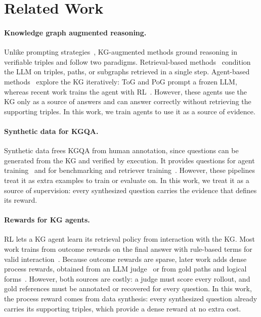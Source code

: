 \section{Related Work}

\paragraph{Knowledge graph augmented reasoning.}
Unlike prompting strategies~\citep{CoT,Self-Consistency,ToT,GoT}, KG-augmented methods ground reasoning in verifiable triples and follow two paradigms. Retrieval-based methods~\citep{RoG,SubGraphRAG,GCR,GNN-RAG,G-Retrieval,PathMind} condition the LLM on triples, paths, or subgraphs retrieved in a single step. Agent-based methods~\citep{ToG,PoG,KG-R1,kg-agent} explore the KG iteratively: ToG and PoG prompt a frozen LLM, whereas recent work trains the agent with RL~\citep{KG-R1,Plan-Then-retrieve,KnowCoder-A1,KBQA-R1,KG-Reasoner,SoG-R1}. However, these agents use the KG only as a source of answers and can answer correctly without retrieving the supporting triples. In this work, we train agents to use it as a source of evidence.

\paragraph{Synthetic data for KGQA.}
Synthetic data frees KGQA from human annotation, since questions can be generated from the KG and verified by execution. It provides questions for agent training~\citep{GraphWalker} and for benchmarking and retriever training~\citep{KGQAGen,GTSQA}. However, these pipelines treat it as extra examples to train or evaluate on. In this work, we treat it as a source of supervision: every synthesized question carries the evidence that defines its reward.

\paragraph{Rewards for KG agents.}
RL lets a KG agent learn its retrieval policy from interaction with the KG. Most work trains from outcome rewards on the final answer with rule-based terms for valid interaction~\citep{KG-R1,Plan-Then-retrieve,KnowCoder-A1,KBQA-R1,KG-Reasoner,SoG-R1,Peak-Then-Collapse}. Because outcome rewards are sparse, later work adds dense process rewards, obtained from an LLM judge~\citep{KG-Hopper} or from gold paths and logical forms~\citep{EoG,RoE,GAPD}. However, both sources are costly: a judge must score every rollout, and gold references must be annotated or recovered for every question. In this work, the process reward comes from data synthesis: every synthesized question already carries its supporting triples, which provide a dense reward at no extra cost.
